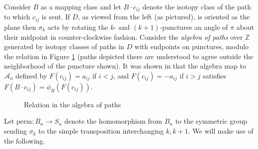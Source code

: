 \documentclass{amsart}[11pt,fullpage]
\def\Z{{\mathbb Z}}
\def\cl{\mathcal}
\def\s{{\sigma}}
\theoremstyle{definition}
\begin{document}
  Consider $B$ as a mapping class and let $B\cdot c_{ij}$ denote the isotopy class of the path to which $c_{ij}$ is sent. If $D$, as viewed from the left (as pictured), is oriented as the plane then $\s_k$ acts by rotating the $k\textrm{-}$ and $(k+1)\textrm{-}$punctures an angle of $\pi$ about their midpoint in counter-clockwise fashion. Consider the \emph{algebra of paths} over $\Z$ generated by isotopy classes of paths in $D$ with endpoints on punctures, modulo the relation in Figure \ref{FigRelnPathAlg} (paths depicted there are understood to agree outside the neighborhood of the puncture shown). It was shown in \cite{Ng05} that the algebra map to $\cl A_n$ defined by $F(c_{ij})=a_{ij}$ if $i<j$, and $F(c_{ij})=-a_{ij}$ if $i>j$ satisfies $F(B\cdot c_{ij}) = \phi_B(F(c_{ij}))$.

  \begin{figure}[ht]
\caption{Relation in the algebra of paths}
\label{FigRelnPathAlg}
\end{figure}
  
  Let $\text{perm}:B_n\to S_n$ denote the homomorphism from $B_n$ to the symmetric group sending $\s_k$ to the simple transposition interchanging $k, k+1$. We will make use of the following.
\end{document}
